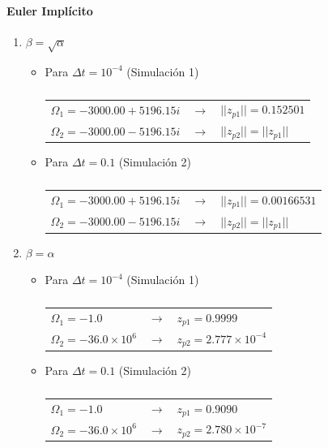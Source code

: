 \begin{table}[H]

\paragraph{Euler Implícito}
\begin{enumerate}[label=(\alph*)]
\item $\beta = \sqrt{\alpha}$ 

\begin{itemize}

\item Para $\Delta t = 10^{-4}$ (Simulación 1)
\begin{center}
\begin{tabular}{lll}
$\Omega_1 = −3000.00 + 5196.15i$ & $\rightarrow$ & $||z_{p1}|| = 0.152501$ \\
$\Omega_2 = −3000.00 - 5196.15i$ & $\rightarrow$ & $||z_{p2}|| = ||z_{p1}||$
\end{tabular}
\end{center}

\item Para $\Delta t = 0.1$ (Simulación 2)
\begin{center}
\begin{tabular}{lll}
$\Omega_1 = −3000.00 + 5196.15i$ & $\rightarrow$ & $||z_{p1}|| = 0.00166531 $ \\
$\Omega_2 = −3000.00 - 5196.15i$ & $\rightarrow$ & $||z_{p2}|| = ||z_{p1}||$
\end{tabular}
\end{center}

\end{itemize}

\item $\beta = \alpha$

\begin{itemize}

\item Para $\Delta t = 10^{-4}$ (Simulación 1)
\begin{center}
\begin{tabular}{lll}
$\Omega_1 = -1.0$ & $\rightarrow$ & $z_{p1} = 0.9999$ \\
$\Omega_2 = -36.0 \times 10^6$ & $\rightarrow$ & $z_{p2} = 2.777 \times 10^{-4}$
\end{tabular}
\end{center}

\item Para $\Delta t = 0.1$ (Simulación 2)
\begin{center}
\begin{tabular}{lll}
$\Omega_1 = -1.0$ & $\rightarrow$ & $z_{p1} = 0.9090$ \\
$\Omega_2 = -36.0 \times 10^6$ & $\rightarrow$ & $z_{p2} = 2.780 \times 10^{-7} $
\end{tabular}
\end{center}

\end{itemize}

\end{enumerate}
\caption{} \label{tabla_euler}
\end{table}

